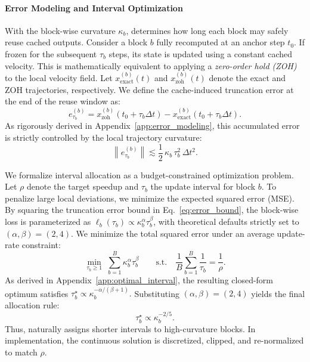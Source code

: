 \paragraph{Error Modeling and Interval Optimization}
With the block-wise curvature $\kappa_b$, \cubic determines how long each block may safely reuse cached outputs. Consider a block $b$ fully recomputed at an anchor step $t_0$. If frozen for the subsequent $\tau_b$ steps, its state is updated using a constant cached velocity. This is mathematically equivalent to applying a \emph{zero-order hold (ZOH)} to the local velocity field. Let $x_{\text{exact}}^{(b)}(t)$ and $x_{\text{zoh}}^{(b)}(t)$ denote the exact and ZOH trajectories, respectively. We define the cache-induced truncation error at the end of the reuse window as:
\begin{equation}
    e_{\tau_b}^{(b)} = x_{\text{zoh}}^{(b)}(t_0 + \tau_b \Delta t) - x_{\text{exact}}^{(b)}(t_0 + \tau_b \Delta t).
    \label{eq:error_def}
\end{equation}
As rigorously derived in Appendix~\ref{app:error_modeling}, this accumulated error is strictly controlled by the local trajectory curvature:
\begin{equation}
    \label{eq:error_bound}
    \left\|e_{\tau_b}^{(b)}\right\| \lesssim \frac{1}{2}\,\kappa_b\,\tau_b^2\,\Delta t^2.
\end{equation}

We formalize interval allocation as a budget-constrained optimization problem. Let $\rho$ denote the target speedup and $\tau_b$ the update interval for block $b$. To penalize large local deviations, we minimize the expected squared error (MSE). By squaring the truncation error bound in Eq.~\ref{eq:error_bound}, the block-wise loss is parameterized as $\ell_b(\tau_b) \propto \kappa_b^\alpha \tau_b^\beta$, with theoretical defaults strictly set to $(\alpha,\beta)=(2,4)$. We minimize the total squared error under an average update-rate constraint:
\begin{equation}
    \min_{\tau_b \ge 1}\; \sum_{b=1}^{B} \kappa_b^\alpha \tau_b^\beta
    \qquad
    \text{s.t.}\quad
    \frac{1}{B}\sum_{b=1}^{B}\frac{1}{\tau_b} = \frac{1}{\rho}.
\end{equation}
As derived in Appendix~\ref{app:optimal_interval}, the resulting closed-form optimum satisfies $\tau_b^\star \propto \kappa_b^{-\alpha/(\beta+1)}.$ Substituting $(\alpha,\beta)=(2,4)$ yields the final allocation rule:
\begin{equation}
    \tau_b^\star \propto \kappa_b^{-2/5}.
\end{equation}
Thus, \cubic naturally assigns shorter intervals to high-curvature blocks. In implementation, the continuous solution is discretized, clipped, and re-normalized to match $\rho$.

